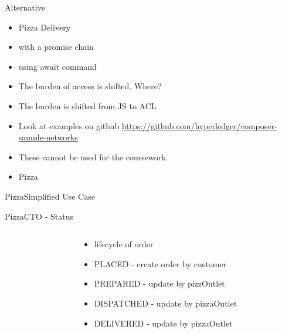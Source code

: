 \documentclass[pdf,table]{beamer}
\begin{document}
\begin{frame}{Alternative}
	\begin{itemize}
		\item Pizza Delivery
		\item with a promise chain
		\item using await command
		\item The burden of access is shifted. Where?
		\item<2-> The burden is shifted from JS to ACL
		\item Look at examples on github \url{https://github.com/hyperledger/composer-sample-networks}
		\item These cannot be used for the coursework.
		\item Pizza
	\end{itemize}
\end{frame}

\begin{frame}{Pizza}{Simplified Use Case}
\centering
{}
\end{frame}

\begin{frame}{Pizza}{CTO - Status}
	\begin{columns}[T]
		\begin{column}{0.44\textwidth}
			
		\end{column}
		\begin{column}{0.44\textwidth}
			\begin{itemize}
				\item<2-> lifecycle of order
				\item<2-> PLACED - create order by customer
				\item<2-> PREPARED - update by pizzOutlet
				\item<2-> DISPATCHED - update by pizzaOutlet
				\item<2-> DELIVERED - update by pizzaOutlet 
			\end{itemize}
		\end{column}
	\end{columns}	
\end{frame}
\end{document}
